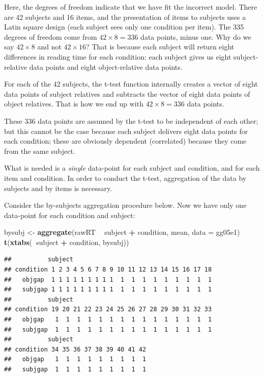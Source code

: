\documentclass[12pt,]{krantz}
\newenvironment{Shaded}{\begin{snugshade}}{\end{snugshade}}
\newcommand{\DataTypeTok}[1]{\textcolor[rgb]{0.13,0.29,0.53}{#1}}
\newcommand{\KeywordTok}[1]{\textcolor[rgb]{0.13,0.29,0.53}{\textbf{#1}}}
\newcommand{\NormalTok}[1]{#1}
\newcommand{\OperatorTok}[1]{\textcolor[rgb]{0.81,0.36,0.00}{\textbf{#1}}}
\newcommand{\StringTok}[1]{\textcolor[rgb]{0.31,0.60,0.02}{#1}}
\begin{document}
Here, the degrees of freedom indicate that we have fit the incorrect model. There are 42 subjects and 16 items, and the presentation of items to subjects uses a Latin square design (each subject sees only one condition per item). The 335 degrees of freedom come from \(42\times 8=336\) data points, minus one. Why do we say \(42\times 8\) and not \(42\times 16\)? That is because each subject will return eight differences in reading time for each condition: each subject gives us eight subject-relative data points and eight object-relative data points.

For each of the 42 subjects, the t-test function internally creates a vector of eight data points of subject relatives and subtracts the vector of eight data points of object relatives. That is how we end up with \(42\times 8=336\) data points.

These 336 data points are assumed by the t-test to be independent of each other; but this cannot be the case because each subject delivers eight data points for each condition; these are obviously dependent (correlated) because they come from the same subject.

What is needed is a \emph{single} data-point for each subject and condition, and for each item and condition. In order to conduct the t-test, aggregation of the data by subjects and by items is necessary.

Consider the by-subjects aggregation procedure below. Now we have only one data-point for each condition and subject:

\begin{Shaded}
\begin{Highlighting}[]
\NormalTok{bysubj <-}\StringTok{ }\KeywordTok{aggregate}\NormalTok{(rawRT }\OperatorTok{~}\StringTok{ }\NormalTok{subject }\OperatorTok{+}\StringTok{ }\NormalTok{condition, }
\NormalTok{  mean, }\DataTypeTok{data =}\NormalTok{ gg05e1)}
\KeywordTok{t}\NormalTok{(}\KeywordTok{xtabs}\NormalTok{(}\OperatorTok{~}\NormalTok{subject }\OperatorTok{+}\StringTok{ }\NormalTok{condition, bysubj))}
\end{Highlighting}
\end{Shaded}

\begin{verbatim}
##          subject
## condition 1 2 3 4 5 6 7 8 9 10 11 12 13 14 15 16 17 18
##   objgap  1 1 1 1 1 1 1 1 1  1  1  1  1  1  1  1  1  1
##   subjgap 1 1 1 1 1 1 1 1 1  1  1  1  1  1  1  1  1  1
##          subject
## condition 19 20 21 22 23 24 25 26 27 28 29 30 31 32 33
##   objgap   1  1  1  1  1  1  1  1  1  1  1  1  1  1  1
##   subjgap  1  1  1  1  1  1  1  1  1  1  1  1  1  1  1
##          subject
## condition 34 35 36 37 38 39 40 41 42
##   objgap   1  1  1  1  1  1  1  1  1
##   subjgap  1  1  1  1  1  1  1  1  1
\end{verbatim}
\end{document}
